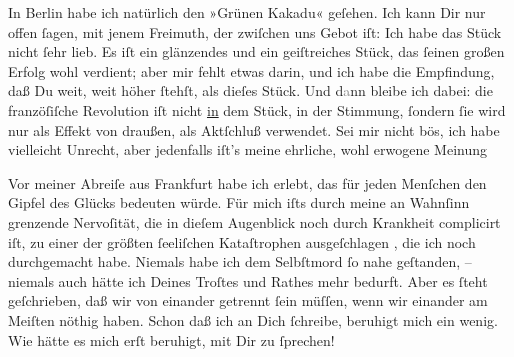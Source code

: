 \pstart
           In Berlin habe ich natürlich den »Grünen Kakadu« geſehen. Ich kann Dir nur offen ſagen, mit
               jenem Freimuth, der zwiſchen uns Gebot iſt: Ich habe das Stück nicht ſehr lieb. Es iſt ein
               glänzendes und ein geiſtreiches Stück, das
               ſeinen großen Erfolg wohl verdient; aber mir fehlt etwas darin, und ich habe die
               Empfindung, daß Du weit, weit höher ſtehſt, als dieſes Stück. Und d\textcolor{gray}{a}nn bleibe ich dabei: die franzöſiſche Revolution iſt
               nicht \uline{in} dem Stück, in der Stimmung, ſondern ſie wird nur  als Effekt von draußen, als Aktſchluß
               verwendet. Sei mir nicht bös, {\pb}ich habe vielleicht
               Unrecht, aber jedenfalls iſt’s meine ehrliche, wohl erwogene Meinung{\dotssix}\pend
           
\pstart
           Vor meiner Abreiſe aus Frankfurt habe ich \label{K_L02875-2v}\label{K_L02875-2}
               erlebt, das für jeden Menſchen den Gipfel des Glücks bedeuten würde. Für mich iſts
               durch meine an Wahnſinn grenzende Nervoſität, die in dieſem Augenblick noch durch
               Krankheit complicirt iſt, zu einer der größten ſeeliſchen Kataſtrophen ausgeſchlagen
                  , die ich noch durchgemacht habe. Niemals
               habe ich dem Selbſtmord ſo nahe geſtanden, – niemals auch hätte ich Deines Troſtes
               und Rathes  mehr bedurft. Aber es ſteht geſchrieben, daß wir von einander getrennt ſein
               müſſen, wenn wir einander {\pb}am Meiſten nöthig haben.
               Schon daß ich an Dich ſchreibe, beruhigt mich ein wenig. Wie hätte es mich erſt
               beruhigt, mit Dir zu ſprechen!\pend
           
